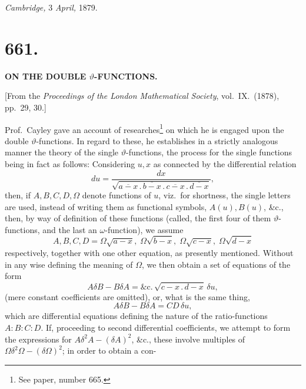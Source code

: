\documentclass[11pt,a4paper]{article}
\begin{document}
\medskip

\hfill \emph{Cambridge,} 3 \emph{April,} 1879.

\newpage


\section*{661.}

\begin{center}
\textbf{ON THE DOUBLE $\vartheta$-FUNCTIONS.}
\end{center}

\medskip

\begin{center}
[From the \emph{Proceedings of the London Mathematical Society}, vol.~IX.\ (1878), pp.~29, 30.]
\end{center}

\medskip

\noindent Prof.\ Cayley gave an account of researches\footnote{See paper, number 665.} on which he is engaged upon the double $\vartheta$-functions. In regard to these, he establishes in a strictly analogous manner the theory of the single $\vartheta$-functions, the process for the single functions being in fact as follows: Considering $u, x$ as connected by the differential relation
\[
du = \frac{dx}{\sqrt{\overline{a - x}\,.\,\overline{b - x}\,.\,\overline{c - x}\,.\,\overline{d - x}}},
\]
then, if $A, B, C, D, \Omega$ denote functions of $u$, viz.\ for shortness, the single letters are used, instead of writing them as functional symbols, $A(u), B(u)$, \&c., then, by way of definition of these functions (called, the first four of them $\vartheta$-functions, and the last an $\omega$-function), we assume
\[
A, B, C, D = \Omega\sqrt{a - x},\; \Omega\sqrt{b - x},\; \Omega\sqrt{c - x},\; \Omega\sqrt{d - x}
\]
respectively, together with one other equation, as presently mentioned. Without in any wise defining the meaning of $\Omega$, we then obtain a set of equations of the form
\[
A\delta B - B\delta A = \&\text{c.}\,\sqrt{c - x\,.\,d - x}\,\delta u,
\]
(mere constant coefficients are omitted), or, what is the same thing,
\[
A\delta B - B\delta A = CD\,\delta u,
\]
which are differential equations defining the nature of the ratio-functions $A : B : C : D$. If, proceeding to second differential coefficients, we attempt to form the expressions for $A\delta^{2}A - (\delta A)^{2}$, \&c., these involve multiples of $\Omega\delta^{2}\Omega - (\delta\Omega)^{2}$; in order to obtain a con-
\end{document}
